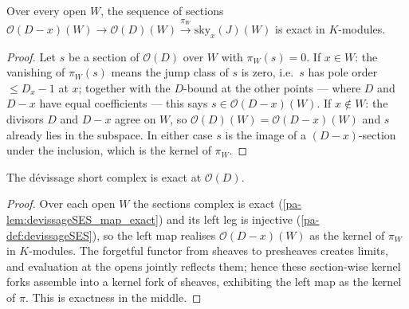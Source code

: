 \begin{lemma}
  \label{pa-lem:devissageSES_map_exact}
  \leanok

  Over every open \(W\), the sequence of sections
  \(\mathcal O(D-x)(W) \to \mathcal O(D)(W) \xrightarrow{\pi_W} \mathrm{sky}_x(J)(W)\) is exact in
  \(K\)-modules.
\end{lemma}
\begin{proof}
  \leanok
  Let \(s\) be a section of \(\mathcal O(D)\) over \(W\) with \(\pi_W(s) = 0\). If \(x \in W\): the
  vanishing of \(\pi_W(s)\) means the jump class of \(s\) is zero, i.e.\ \(s\) has pole order
  \(\le D_x - 1\) at \(x\); together with the \(D\)-bound at the other points --- where \(D\) and
  \(D-x\) have equal coefficients --- this says \(s \in \mathcal O(D-x)(W)\). If \(x \notin W\): the
  divisors \(D\) and \(D-x\) agree on \(W\), so \(\mathcal O(D)(W) = \mathcal O(D-x)(W)\) and \(s\)
  already lies in the subspace. In either case \(s\) is the image of a \((D-x)\)-section under the
  inclusion, which is the kernel of \(\pi_W\).
\end{proof}

\begin{theorem}
  \label{pa-thm:devissageSES_exact}
  \leanok

  The dévissage short complex is exact at \(\mathcal O(D)\).
\end{theorem}
\begin{proof}
  \leanok
  Over each open \(W\) the sections complex is exact (\ref{pa-lem:devissageSES_map_exact}) and its left
  leg is injective (\ref{pa-def:devissageSES}), so the left map realises \(\mathcal O(D-x)(W)\) as the
  kernel of \(\pi_W\) in \(K\)-modules. The forgetful functor from sheaves to presheaves creates
  limits, and evaluation at the opens jointly reflects them; hence these section-wise kernel forks
  assemble into a kernel fork of sheaves, exhibiting the left map as the kernel of \(\pi\). This is
  exactness in the middle.
\end{proof}

